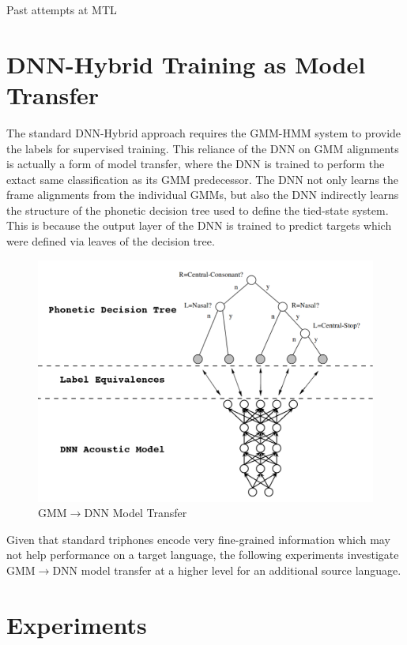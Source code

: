 \documentclass[a4paper]{article}
\begin{document}
Past attempts at MTL


\section{DNN-Hybrid Training as Model Transfer}

The standard DNN-Hybrid approach requires the GMM-HMM system to provide the labels for supervised training. This reliance of the DNN on GMM alignments is actually a form of model transfer, where the DNN is trained to perform the extact same classification as its GMM predecessor. The DNN not only learns the frame alignments from the individual GMMs, but also the DNN indirectly learns the structure of the phonetic decision tree used to define the tied-state system. This is because the output layer of the DNN is trained to predict targets which were defined via leaves of the decision tree.


\begin{figure}[!htb]
  \centering
{}
  \includegraphics[width=\linewidth]{figs/tree-net.png}
  \caption{GMM$\rightarrow$DNN Model Transfer}
\endminipage\hfill
\end{figure}


Given that standard triphones encode very fine-grained information which may not help performance on a target language, the following experiments investigate GMM$\rightarrow$DNN model transfer at a higher level for an additional source language. 


\section{Experiments}
\end{document}
